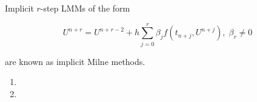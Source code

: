Implicit $r$-step LMMs of the form

$$
U^{n+r} = U^{n+r-2} + h \sum\limits_{j=0}^{r}{\beta_j f\left(t_{n+j}, U^{n+j} \right)}, \; \beta_r \neq 0
$$

are known as implicit Milne methods.

\begin{enumerate}
  \item 
  \pagebreak
  \item 
\end{enumerate} 